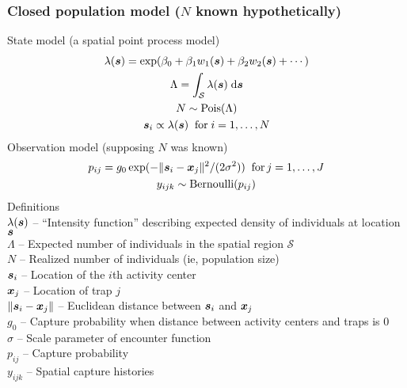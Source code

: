 \documentclass[color=usenames,dvipsnames]{beamer}\usepackage[]{graphicx}\usepackage[]{color}
\begin{document}





\begin{frame}
  \frametitle{\large Closed population model ($N$ known hypothetically) }
  \footnotesize
  State model (a spatial point process model) %
  \begin{gather*}
    \lambda({\bm s}) = \exp(\beta_0 + \beta_1 w_1({\bm s}) + \beta_2 w_2({\bm s}) + \cdots) \\
    \Lambda = \int_{\mathcal{S}} \lambda({\bm s}) \; \mathrm{d}{\bm s} \\
    N \sim \mathrm{Pois}(\Lambda) \\
    {\bm s}_i \propto \lambda({\bm s}) \;\; \mathrm{for}\; i=1,\dots,N 
  \end{gather*}
  \pause
  Observation model (supposing $N$ was known)
  \begin{gather*}
    p_{ij} = g_0\exp(-\|{\bm s}_i - {\bm x}_j\|^2/(2\sigma^2))  \;\; \mathrm{for}\, j=1,\dots,J  \\
    y_{ijk} \sim \mathrm{Bernoulli}(p_{ij})
  \end{gather*}
  \pause
  \scriptsize
  Definitions \\
  \hangindent=0.9cm $\lambda({\bm s})$ -- ``Intensity function'' %
  describing expected density of individuals at location ${\bm s}$ \\ 
  $\Lambda$ -- Expected number of individuals in the spatial region $\mathcal{S}$ \\
  $N$ -- Realized number of individuals (ie, population size) \\
  ${\bm s}_i$ -- Location of the $i$th activity center \\
  ${\bm x}_j$ -- Location of trap $j$ \\
  $\|{\bm s}_i - {\bm x}_j\|$ -- Euclidean distance between ${\bm s}_i$ and ${\bm x}_j$ \\
  $g_0$ -- Capture probability when distance between activity centers
  and traps is 0 \\
  $\sigma$ -- Scale parameter of encounter function \\
  $p_{ij}$ -- Capture probability \\
  $y_{ijk}$ -- Spatial capture histories \\
\end{frame}
\end{document}
